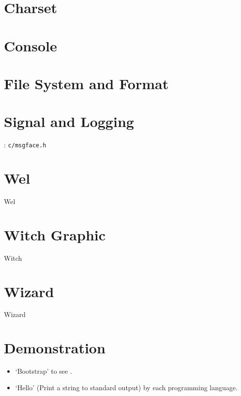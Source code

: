 \section{Charset}


\section{Console}


\section{File System and Format}


\section{Signal and Logging}

: \verb`c/msgface.h`





\section{Wel}
{Wel}

\section{Witch Graphic} 
{Witch}

\section{Wizard}
{Wizard}

\section{Demonstration}

\begin{itemize}
	\item `Bootstrap' to see .
	\item `Hello' (Print a string to standard output) by each programming language. 
\end{itemize}

